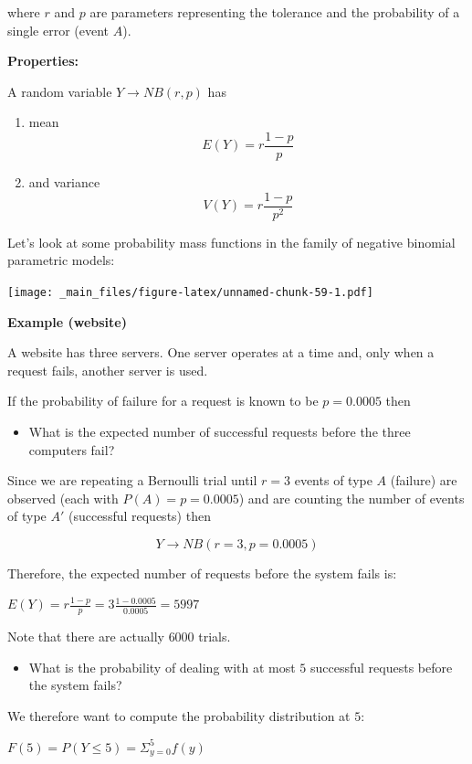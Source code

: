 \documentclass[
]{book}
\providecommand{\tightlist}{%
  \setlength{\itemsep}{0pt}\setlength{\parskip}{0pt}}
\begin{document}
where \(r\) and \(p\) are parameters representing the tolerance and the probability of a single error (event \(A\)).

\textbf{Properties:}

A random variable \(Y\rightarrow NB(r,p)\) has

\begin{enumerate}
\def\labelenumi{\arabic{enumi})}
\item
  mean \[E(Y)= r\frac{1-p}{p}\]
\item
  and variance \[V(Y)= r\frac{1-p}{p^2}\]
\end{enumerate}

Let's look at some probability mass functions in the family of negative binomial parametric models:

\texttt{[image: \_main\_files/figure-latex/unnamed-chunk-59-1.pdf]}

\textbf{Example (website)}

A website has three servers. One server operates at a time and, only when a request fails, another server is used.

If the probability of failure for a request is known to be \(p=0.0005\) then

\begin{itemize}
\tightlist
\item
  What is the expected number of successful requests before the three computers fail?
\end{itemize}

Since we are repeating a Bernoulli trial until \(r=3\) events of type \(A\) (failure) are observed (each with \(P(A)=p=0.0005\)) and are counting the number of events of type \(A'\) (successful requests) then

\[Y \rightarrow NB(r=3, p=0.0005)\]

Therefore, the expected number of requests before the system fails is:

\(E(Y)=r\frac{1-p}{p}=3\frac{1-0.0005}{0.0005}=5997\)

Note that there are actually \(6000\) trials.

\begin{itemize}
\tightlist
\item
  What is the probability of dealing with at most \(5\) successful requests before the system fails?
\end{itemize}

We therefore want to compute the probability distribution at \(5\):

\(F(5)=P(Y\leq 5)=\Sigma_{y=0}^5 f(y)\)
\end{document}
